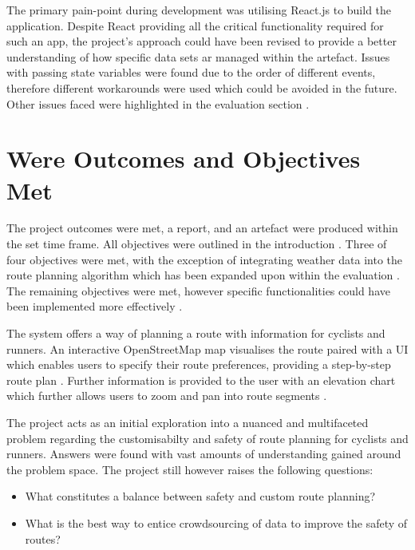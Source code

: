 The primary pain-point during development was utilising React.js to build the application. Despite React providing all the critical functionality required for such an app, the project's approach could have been revised to provide a better understanding of how specific data sets ar managed within the artefact. Issues with passing state variables were found due to the order of different events, therefore different workarounds were used which could be avoided in the future. Other issues faced were highlighted in the evaluation section .

\label{reflection-and-conclusion:outcomes/objectives-met}
\section{Were Outcomes and Objectives Met}

The project outcomes were met, a report, and an artefact were produced within the set time frame. All objectives were outlined in the introduction . Three of four objectives were met, with the exception of integrating weather data into the route planning algorithm which has been expanded upon within the evaluation . The remaining objectives were met, however specific functionalities could have been implemented more effectively .

The system offers a way of planning a route with information for cyclists and runners. An interactive OpenStreetMap map visualises the route paired with a UI which enables users to specify their route preferences, providing a step-by-step route plan . Further information is provided to the user with an elevation chart which further allows users to zoom and pan into route segments .

The project acts as an initial exploration into a nuanced and multifaceted problem regarding the customisabilty and safety of route planning for cyclists and runners. Answers were found with vast amounts of understanding gained around the problem space. The project still however raises the following questions:
\begin{itemize}
    \item What constitutes a balance between safety and custom route planning?
    \item What is the best way to entice crowdsourcing of data to improve the safety of routes?
\end{itemize}

